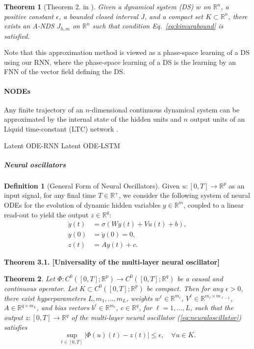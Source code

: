 \documentclass{article}
\newtheorem{theorem}{Theorem}
\theoremstyle{definition}
\newtheorem{definition}{Definition}
\theoremstyle{remark}
\begin{document}
\begin{theorem}[Theorem 2. in \citep{kimura1998learning}]%
Given a dynamical system (DS) \( w \) on \( \mathbb{R}^n \), a positive constant \( \epsilon \), a bounded closed interval \( J \), and a compact set \( K \subset \mathbb{R}^n \), there exists an A-NDS \( J_{h,m} \) on \( \mathbb{R}^n \) such that condition Eq.~\ref{eq:kimurabound} is satisfied. 
\end{theorem}
Note that this approximation method is viewed as a phase-space learning of a DS \citep{tsung1993phase} using our RNN, where the phase-space learning of a DS is the learning by an FNN of the vector field defining the DS.

\paragraph{NODEs}
Any finite trajectory of an $n$-dimensional continuous dynamical system can be approximated by the internal state of the hidden units and $n$ output units of an Liquid time-constant (LTC) network \citep{hasani2018liquid}.

\citep{chen2018neural}

Latent ODE-RNN\citep{rubanova2019latent}
Latent ODE-LSTM \citep{coelho2024enhancing}

\subparagraph{Neural oscillators}
\citep{lanthaler2023}
\begin{definition}[General Form of Neural Oscillators]
Given \( u : [0, T ] \to \mathbb{R}^p \) as an input signal, for any final time \( T \in \mathbb{R}^+ \), we consider the following system of neural ODEs for the evolution of dynamic hidden variables \( y \in \mathbb{R}^m \), coupled to a linear read-out to yield the output \( z \in \mathbb{R}^q \):
\begin{equation}\label{eq:neuraloscillator}
\begin{aligned}
    \ddot{y}(t) &= \sigma(W y(t) + V u(t) + b), \\
    y(0) &= \dot{y}(0) = 0, \\
    z(t) &= A y(t) + c.
\end{aligned}
\end{equation}
\end{definition}

\textbf{Theorem 3.1. [Universality of the multi-layer neural oscillator]}
\begin{theorem}
Let \( \Phi : C^0([0, T ]; \mathbb{R}^p) \to C^0([0, T ]; \mathbb{R}^q) \) be a causal and continuous operator. Let \( K \subset C^0([0, T ]; \mathbb{R}^p) \) be compact. Then for any \( \epsilon > 0 \), there exist hyperparameters \( L, m_1, \dots, m_L \), weights \( w^\ell \in \mathbb{R}^{m_\ell} \), \( V^\ell \in \mathbb{R}^{m_\ell \times m_{\ell-1}} \), \( A \in \mathbb{R}^{q \times m_L} \), and bias vectors \( b^\ell \in \mathbb{R}^{m_\ell} \), \( c \in \mathbb{R}^q \), for \( \ell = 1, \dots, L \), such that the output \( z : [0, T] \to \mathbb{R}^q \) of the multi-layer neural oscillator (\ref{eq:neuraloscillator}) satisfies
\[
\sup_{t \in [0, T]} | \Phi(u)(t) - z(t) | \leq \epsilon, \quad \forall u \in K.
\]
\end{theorem}
\end{document}
